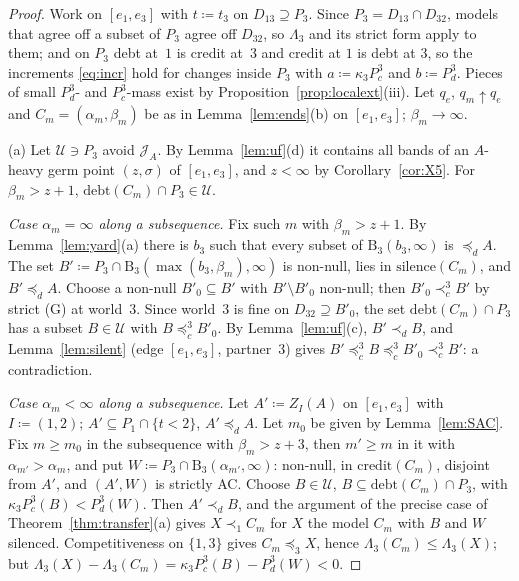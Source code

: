 \documentclass[11pt]{article}
\theoremstyle{definition}\newtheorem{definition}[theorem]{Definition}
\theoremstyle{remark}\newtheorem{remark}[theorem]{Remark}
\newcommand{\debt}{\mathrm{debt}}
\newcommand{\cred}{\mathrm{credit}}
\newcommand{\sil}{\mathrm{silence}}
\newcommand{\Band}{\mathrm{B}}
\newcommand{\Jid}{\mathcal J}
\newcommand{\Uf}{\mathcal U}
\begin{document}
\begin{proof}
Work on $[e_1,e_3]$ with $t\coloneqq t_3$ on $D_{13}\supseteq P_3$. Since
$P_3=D_{13}\cap D_{32}$, models that agree off a subset of $P_3$ agree off
$D_{32}$, so $\Lambda_3$ and its strict form apply to them; and on $P_3$
debt at~$1$ is credit at~$3$ and credit at $1$ is debt at $3$, so the
increments \eqref{eq:incr} hold for changes inside $P_3$ with
$a\coloneqq\kappa_3P^3_c$ and $b\coloneqq P^3_d$. Pieces of small $P^3_d$-
and $P^3_c$-mass exist by Proposition~\ref{prop:localext}(iii). Let $q_e$,
$q_m\uparrow q_e$ and $C_m=(\alpha_m,\beta_m)$ be as in
Lemma~\ref{lem:ends}(b) on $[e_1,e_3]$; $\beta_m\to\infty$.

(a) Let $\Uf\ni P_3$ avoid $\Jid_A$. By Lemma~\ref{lem:uf}(d) it contains
all bands of an $A$-heavy germ point $(z,\sigma)$ of $[e_1,e_3]$, and
$z<\infty$ by Corollary~\ref{cor:X5}. For $\beta_m>z+1$,
$\debt(C_m)\cap P_3\in\Uf$.

\emph{Case $\alpha_m=\infty$ along a subsequence.} Fix such $m$ with
$\beta_m>z+1$. By Lemma~\ref{lem:yard}(a) there is $b_3$ such that every
subset of $\Band_3(b_3,\infty)$ is $\preceq_dA$. The set
$B'\coloneqq P_3\cap\Band_3(\max(b_3,\beta_m),\infty)$ is non-null, lies in
$\sil(C_m)$, and $B'\preceq_dA$. Choose a non-null $B'_0\subseteq B'$ with
$B'\setminus B'_0$ non-null; then $B'_0\prec^3_cB'$ by strict (G) at
world~$3$. Since world~$3$ is fine on $D_{32}\supseteq B'_0$, the set
$\debt(C_m)\cap P_3$ has a subset $B\in\Uf$ with $B\preceq^3_cB'_0$. By
Lemma~\ref{lem:uf}(c), $B'\prec_dB$, and Lemma~\ref{lem:silent} (edge
$[e_1,e_3]$, partner~$3$) gives $B'\preceq^3_cB\preceq^3_cB'_0\prec^3_cB'$:
a contradiction.

\emph{Case $\alpha_m<\infty$ along a subsequence.} Let $A'\coloneqq Z_I(A)$
on $[e_1,e_3]$ with $I\coloneqq(1,2)$; $A'\subseteq P_1\cap\{t<2\}$,
$A'\preceq_dA$. Let $m_0$ be given by Lemma~\ref{lem:SAC}. Fix $m\ge m_0$ in
the subsequence with $\beta_m>z+3$, then $m'\ge m$ in it with
$\alpha_{m'}>\alpha_m$, and put $W\coloneqq P_3\cap\Band_3(\alpha_{m'},
\infty)$: non-null, in $\cred(C_m)$, disjoint from $A'$, and $(A',W)$ is
strictly AC. Choose $B\in\Uf$, $B\subseteq\debt(C_m)\cap P_3$, with
$\kappa_3P^3_c(B)<P^3_d(W)$. Then $A'\prec_dB$, and the argument of the
precise case of Theorem~\ref{thm:transfer}(a) gives $X\prec_1C_m$ for $X$ the
model $C_m$ with $B$ and $W$ silenced. Competitiveness on $\{1,3\}$ gives
$C_m\preceq_3X$, hence $\Lambda_3(C_m)\le\Lambda_3(X)$; but
$\Lambda_3(X)-\Lambda_3(C_m)=\kappa_3P^3_c(B)-P^3_d(W)<0$.


\end{proof}
\end{document}

